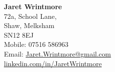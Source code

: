 \documentclass[a4paper,9pt]{extarticle}
\begin{document}
\pagestyle{empty}

\begin{center}
\textbf{\Large Jaret Wrintmore}\\[2pt] %

\vspace{3mm}72a, School Lane,\\Shaw, Melksham\\ SN12 8EJ \\\vspace{1mm} Mobile: 07516 586963 \\\vspace{1mm} Email: \href{mailto:jaret.wrintmore@gmail.com}{Jaret.Wrintmore@gmail.com} \\\vspace{1mm}\href{https://www.linkedin.com/in/JaretWrintmore}{linkedin.com/in/JaretWrintmore} %
\end{center}








\end{document}
